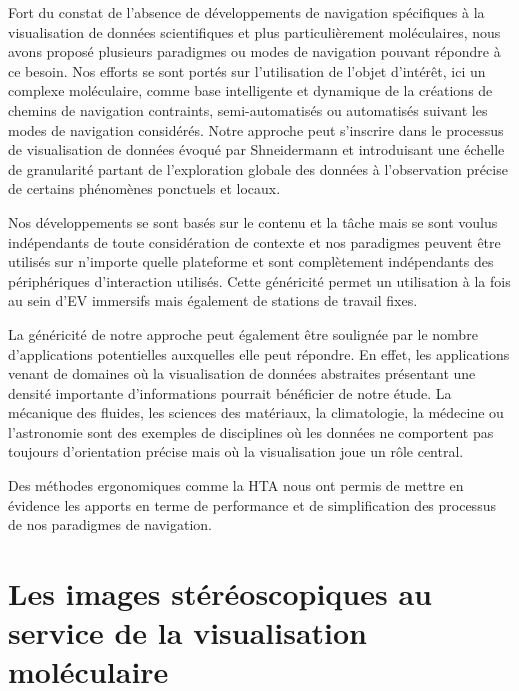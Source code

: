 Fort du constat de l'absence de développements de navigation spécifiques à la visualisation de données scientifiques et plus particulièrement moléculaires, nous avons proposé plusieurs paradigmes ou modes de navigation pouvant répondre à ce besoin. Nos efforts se sont portés sur l'utilisation de l'objet d'intérêt, ici un complexe moléculaire, comme base intelligente et dynamique de la créations de chemins de navigation contraints, semi-automatisés ou automatisés suivant les modes de navigation considérés. Notre approche peut s'inscrire dans le processus de visualisation de données évoqué par Shneidermann et introduisant une échelle de granularité partant de l'exploration globale des données à l'observation précise de certains phénomènes ponctuels et locaux.

Nos développements se sont basés sur le contenu et la tâche mais se sont voulus indépendants de toute considération de contexte et nos paradigmes peuvent être utilisés sur n'importe quelle plateforme et sont complètement indépendants des périphériques d'interaction utilisés. Cette généricité permet un utilisation à la fois au sein d'EV immersifs mais également de stations de travail fixes.

La généricité de notre approche peut également être soulignée par le nombre d'applications potentielles auxquelles elle peut répondre. En effet, les applications venant de domaines où la visualisation de données abstraites présentant une densité importante d'informations pourrait bénéficier de notre étude. La mécanique des fluides, les sciences des matériaux, la climatologie, la médecine ou l'astronomie sont des exemples de disciplines où les données ne comportent pas toujours d'orientation précise mais où la visualisation joue un rôle central.

Des méthodes ergonomiques comme la HTA nous ont permis de mettre en évidence les apports en terme de performance et de simplification des processus de nos paradigmes de navigation. 


\section{Les images stéréoscopiques au service de la visualisation moléculaire}

